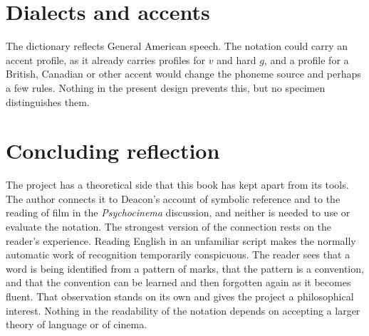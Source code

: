 \section{Dialects and accents}
The dictionary reflects General American speech. The notation could carry an accent profile, as it already carries profiles for $v$ and hard $g$, and a profile for a British, Canadian or other accent would change the phoneme source and perhaps a few rules. Nothing in the present design prevents this, but no specimen distinguishes them.

\section{Concluding reflection}
The project has a theoretical side that this book has kept apart from its tools. The author connects it to Deacon's account of symbolic reference and to the reading of film in the \emph{Psychocinema} discussion, and neither is needed to use or evaluate the notation. The strongest version of the connection rests on the reader's experience. Reading English in an unfamiliar script makes the normally automatic work of recognition temporarily conspicuous. The reader sees that a word is being identified from a pattern of marks, that the pattern is a convention, and that the convention can be learned and then forgotten again as it becomes fluent. That observation stands on its own and gives the project a philosophical interest. Nothing in the readability of the notation depends on accepting a larger theory of language or of cinema.
